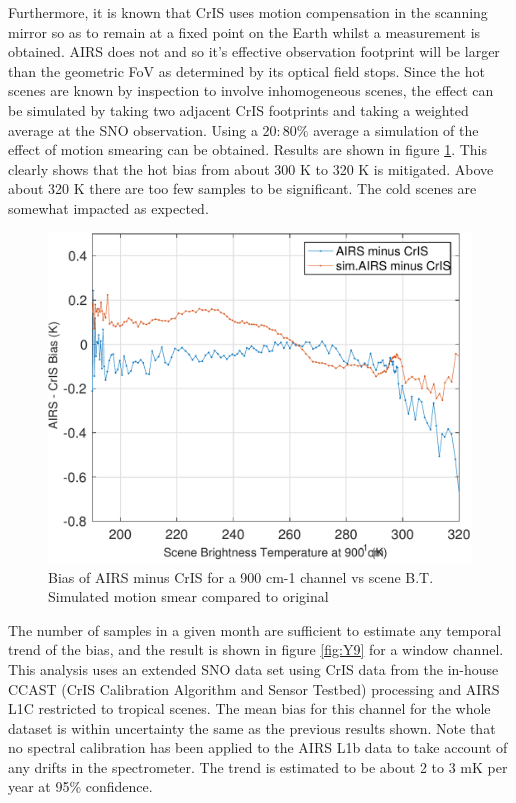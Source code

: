 \documentclass[11pt]{article}
\begin{document}
Furthermore, it is known that CrIS uses motion compensation in the scanning mirror so as to remain at a fixed point on the Earth whilst a measurement is obtained. AIRS does not and so it's effective observation footprint will be larger than the geometric FoV as determined by its optical field stops. Since the hot scenes are known by inspection to involve inhomogeneous scenes, the effect can be simulated by taking two adjacent CrIS footprints and taking a weighted average at the SNO observation. Using a $20:80 \% $ average a simulation of the effect of motion smearing can be obtained. Results are shown in figure \ref{fig:Y8}. This clearly shows that the hot bias from about 300 K to 320 K is mitigated. Above about 320 K there are too few samples to be significant. The cold scenes are somewhat impacted as expected.

\begin{figure}[htb]
\centering
\includegraphics[width=.6\linewidth]{./figs/2013_AC_quantile_wSimAIRS.pdf}
\caption{\label{fig:orgparagraph18}
  Bias of AIRS minus CrIS for a 900 cm-1 channel vs scene B.T. Simulated motion smear compared to original}
\label{fig:Y8}
\end{figure}

The number of samples in a given month are sufficient to estimate any temporal trend of the bias, and the result is shown in figure \ref{fig:Y9} for a window channel. This analysis uses an extended SNO data set using CrIS data from the in-house CCAST (CrIS Calibration Algorithm and Sensor Testbed) processing \cite{Motteler2014} and AIRS L1C restricted to tropical scenes. The mean
bias for this channel for the whole dataset is within uncertainty the same as the previous results shown. Note that no spectral calibration has been applied to the AIRS L1b data to take account of any drifts in the spectrometer. The trend is estimated to be about 2 to 3 mK per year at 95\% confidence. 
\end{document}
